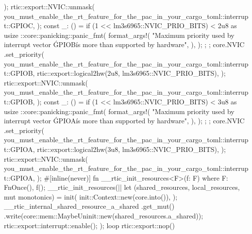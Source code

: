 {{{                );
            rtic::export::NVIC::unmask(
                you_must_enable_the_rt_feature_for_the_pac_in_your_cargo_toml::interrupt::GPIOC,
            );
            const _: () = if (1 << lm3s6965::NVIC_PRIO_BITS) < 2u8 as usize {
                {
                    ::core::panicking::panic_fmt(
                        format_args!(
                            "Maximum priority used by interrupt vector \'GPIOB\' is more than supported by hardware",
                        ),
                    );
                };
            };
            core.NVIC
                .set_priority(
                    you_must_enable_the_rt_feature_for_the_pac_in_your_cargo_toml::interrupt::GPIOB,
                    rtic::export::logical2hw(2u8, lm3s6965::NVIC_PRIO_BITS),
                );
            rtic::export::NVIC::unmask(
                you_must_enable_the_rt_feature_for_the_pac_in_your_cargo_toml::interrupt::GPIOB,
            );
            const _: () = if (1 << lm3s6965::NVIC_PRIO_BITS) < 3u8 as usize {
                {
                    ::core::panicking::panic_fmt(
                        format_args!(
                            "Maximum priority used by interrupt vector \'GPIOA\' is more than supported by hardware",
                        ),
                    );
                };
            };
            core.NVIC
                .set_priority(
                    you_must_enable_the_rt_feature_for_the_pac_in_your_cargo_toml::interrupt::GPIOA,
                    rtic::export::logical2hw(3u8, lm3s6965::NVIC_PRIO_BITS),
                );
            rtic::export::NVIC::unmask(
                you_must_enable_the_rt_feature_for_the_pac_in_your_cargo_toml::interrupt::GPIOA,
            );
            #[inline(never)]
            fn __rtic_init_resources<F>(f: F)
            where
                F: FnOnce(),
            {
                f();
            }
            __rtic_init_resources(|| {
                let (shared_resources, local_resources, mut monotonics) = init(
                    init::Context::new(core.into()),
                );
                __rtic_internal_shared_resource_a_shared
                    .get_mut()
                    .write(core::mem::MaybeUninit::new(shared_resources.a_shared));
                rtic::export::interrupt::enable();
            });
            loop {
                rtic::export::nop()
            }
        }
    }
}
